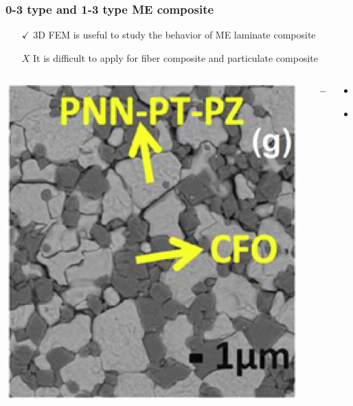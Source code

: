 \documentclass[compress]{beamer}
\begin{document}
\begin{frame}\frametitle{0-3 type and 1-3 type ME composite}
\begin{itemize}[]
	\item[{\color{green} $\checkmark$}] 3D FEM is useful to study the behavior of ME laminate composite
	\item[{\color{red} $X$}] It is difficult to apply for fiber composite and particulate composite
	\end{itemize}

\begin{columns}[totalwidth=\textwidth]
   \begin{column}{.30\textwidth}
   \includegraphics[width=0.99\textwidth]{Graphic/04_realimage}
   \end{column}
   \begin{column}{.05\textwidth}
   {\color{red} \Large$\mathbf{\boldsymbol{\rightarrow}}$}
   \end{column}
   \begin{column}{.65\textwidth}
   \begin{itemize}[label=$\bullet$, font=\small, leftmargin=*]
	\item a
	\item b

\end{itemize}
\end{column}
\end{columns}
\end{frame}
\end{document}
